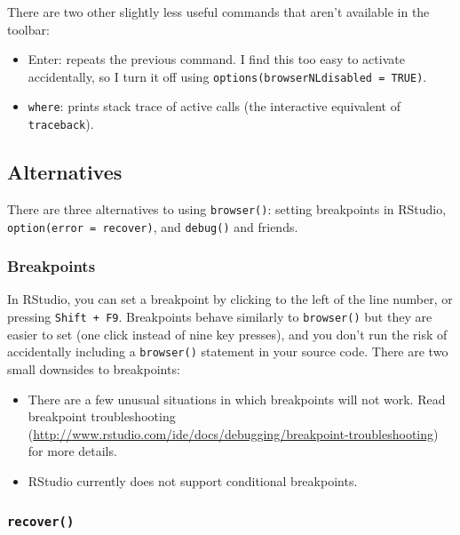 \documentclass[]{book}
\renewcommand{\href}[2]{#2 (\url{#1})}
\begin{document}
There are two other slightly less useful commands that aren't available in the toolbar:

\begin{itemize}
\item
  Enter: repeats the previous command. I find this too easy to activate
  accidentally, so I turn it off using \texttt{options(browserNLdisabled\ =\ TRUE)}.
\item
  \texttt{where}: prints stack trace of active calls (the interactive equivalent of
  \texttt{traceback}).
\end{itemize}

\hypertarget{alternatives}{%
\subsection{Alternatives}\label{alternatives}}

There are three alternatives to using \texttt{browser()}: setting breakpoints in RStudio, \texttt{option(error\ =\ recover)}, and \texttt{debug()} and friends.

\hypertarget{breakpoints}{%
\subsubsection{Breakpoints}\label{breakpoints}}


In RStudio, you can set a breakpoint by clicking to the left of the line number, or pressing \texttt{Shift\ +\ F9}. Breakpoints behave similarly to \texttt{browser()} but they are easier to set (one click instead of nine key presses), and you don't run the risk of accidentally including a \texttt{browser()} statement in your source code. There are two small downsides to breakpoints:

\begin{itemize}
\item
  There are a few unusual situations in which breakpoints will not work.
  Read \href{http://www.rstudio.com/ide/docs/debugging/breakpoint-troubleshooting}{breakpoint troubleshooting} for more details.
\item
  RStudio currently does not support conditional breakpoints.
\end{itemize}

\hypertarget{recover}{%
\subsubsection{\texorpdfstring{\texttt{recover()}}{recover()}}\label{recover}}
\end{document}
